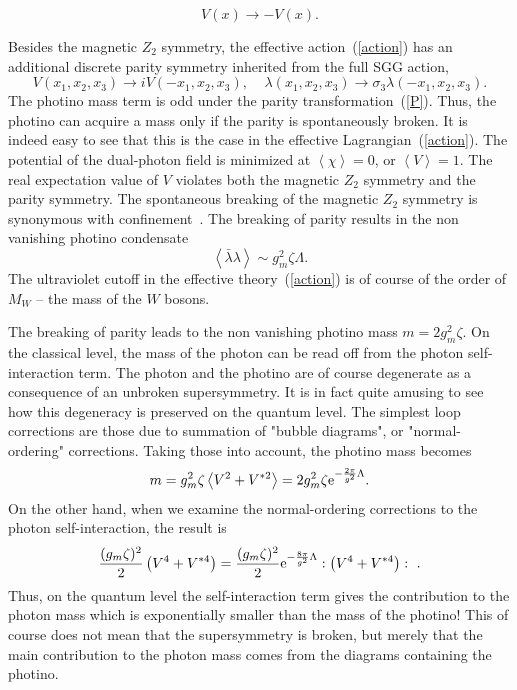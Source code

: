 \documentclass[a4paper,12pt]{article}
\begin{document}
\begin{equation}
V(x)\rightarrow -V(x).
\label{M}
\end{equation}

Besides the magnetic $Z_2$ symmetry, the effective action~(\ref{action})
has an additional discrete parity symmetry
inherited from the full SGG action,
\begin{equation}
V(x_1,x_2,x_3)\rightarrow iV(-x_1,x_2,x_3),\ \ \ \ \
\lambda(x_1,x_2,x_3)\rightarrow\sigma_3\lambda(-x_1,x_2,x_3).
\label{P}\end{equation} The photino mass term is odd under the
parity transformation~(\ref{P}). Thus, the photino can acquire a
mass only if the parity is spontaneously broken. It is indeed easy
to see that this is the case in the effective
Lagrangian~(\ref{action}). The potential of the dual-photon field
is minimized at $\left<\chi\right>=0$, or $\left<V\right>=1$. The
real expectation value of $V$ violates both the magnetic $Z_2$
symmetry and the parity symmetry. The spontaneous breaking of the
magnetic $Z_2$ symmetry is synonymous with
confinement~\cite{kovner}.  The breaking of parity results in the
non vanishing photino condensate
\begin{equation}
\left<\bar\lambda\lambda\right>\sim g_m^2\zeta \Lambda.
\end{equation}
The ultraviolet cutoff in the effective theory~(\ref{action}) is
of course of the order of $M_W$ -- the mass of the $W$ bosons.

The breaking of parity leads to the non vanishing photino mass
$m=2g_m^2\zeta$. On the classical level, the mass of the photon
can be read off from the photon self-interaction term. The photon
and the photino are of course degenerate as a consequence of an
unbroken supersymmetry.  It is in fact quite amusing to see how
this degeneracy is preserved on the quantum level. The simplest
loop corrections are those due to summation of "bubble diagrams",
or "normal-ordering" corrections. Taking those into account, the
photino mass becomes
\begin{equation}
m=g_m^2\zeta \left<V^2+V^{*2}\right>=2g_m^2\zeta {\rm e}^{-{2\pi\over g^2}\Lambda}.
\end{equation}
On the other hand, when we examine the normal-ordering corrections
to the photon self-interaction, the result is
\begin{equation}
{(g_m\zeta)^2\over 2}\left(V^4+V^{*4}\right)={(g_m\zeta)^2\over 2} {\rm e}^{-{8\pi
\over g^2}\Lambda}:\left(V^4+V^{*4}\right):~ .
\end{equation}
Thus, on the quantum level the self-interaction term gives the
contribution to the photon mass which is exponentially smaller
than the mass of the photino! This of course does not mean that
the supersymmetry is broken, but merely that the main contribution
to the photon mass comes from the diagrams containing the photino.
\end{document}
